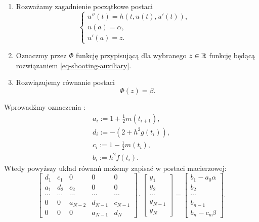 \documentclass[notheorems]{beamer}
\begin{document}
\begin{frame}
\begin{algorithm}
\begin{enumerate}
\item Rozważamy zagadnienie początkowe postaci
\begin{equation} \label{eq-shooting-auxiliary}
\left\{\begin{array}{ll}
u''(t)=h(t,u(t),u'(t)), & \\
u(a)= \alpha, & \\
u'(a)= z.
\end{array}\right.
\end{equation}
\item Oznaczmy przez $\Phi$ funkcję przypisującą dla wybranego $z \in \mathbb{R}$ funkcję będącą rozwiązaniem \eqref{eq-shooting-auxiliary}.
\item Rozwiązujemy równanie postaci 
$$
\Phi(z) = \beta.
$$ 
\end{enumerate}
\end{algorithm}
\end{frame}
\begin{frame}
\begin{small}
Wprowadźmy oznaczenia :
\begin{align*}
a_i:= 1 + \frac{1}{2}m(t_{i+1}),\\
d_i:= -(2+h^2 g(t_i)), \\
c_i:= 1 - \frac{1}{2}m(t_i), \\
b_i:= h^2 f(t_i).
\end{align*}
Wtedy powyższy układ równań możemy zapisać w postaci macierzowej:
\begin{equation}\label{macierz}
\left[ \begin{array}{ccccc}
d_1 & c_1 & 0 & 0 & 0 \\
a_1 & d_2 & c_2 & 0 & 0\\
\cdots & \cdots & \cdots &\cdots  &\cdots \\
0 & 0 & a_{N-2} & d_{N-1} & c_{N-1}\\
0 & 0 & 0 & a_{N-1} & d_N 
\end{array} \right] \cdot
\left[ \begin{array}{c}
y_1 \\
y_2 \\
\cdots \\
y_{N-1} \\
y_{N}  
\end{array} \right] =
\left[ \begin{array}{c}
b_1 - a_0\alpha\\
b_2 \\
\cdots \\
b_{n-1} \\
b_n -c_n\beta 
\end{array} \right] .
\end{equation}
\end{small}
\end{frame}
\end{document}
